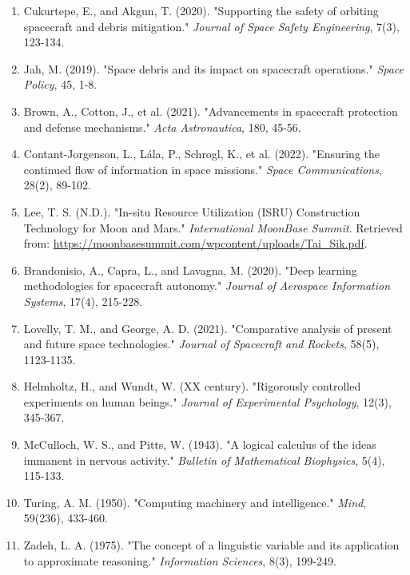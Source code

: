 \documentclass[a4paper, 11pt]{article}
\begin{document}
\begin{enumerate}
    \item Cukurtepe, E., and Akgun, T. (2020). "Supporting the safety of orbiting spacecraft and debris mitigation." \textit{Journal of Space Safety Engineering}, 7(3), 123-134.
    
    \item Jah, M. (2019). "Space debris and its impact on spacecraft operations." \textit{Space Policy}, 45, 1-8.
    
    \item Brown, A., Cotton, J., et al. (2021). "Advancements in spacecraft protection and defense mechanisms." \textit{Acta Astronautica}, 180, 45-56.
    
    \item Contant-Jorgenson, L., Lála, P., Schrogl, K., et al. (2022). "Ensuring the continued flow of information in space missions." \textit{Space Communications}, 28(2), 89-102.
    
    \item Lee, T. S. (N.D.). "In-situ Resource Utilization (ISRU) Construction Technology for Moon and Mars." \textit{International MoonBase Summit}. Retrieved from: \url{https://moonbasesummit.com/wpcontent/uploads/Tai_Sik.pdf}.
    
    \item Brandonisio, A., Capra, L., and Lavagna, M. (2020). "Deep learning methodologies for spacecraft autonomy." \textit{Journal of Aerospace Information Systems}, 17(4), 215-228.
    
    \item Lovelly, T. M., and George, A. D. (2021). "Comparative analysis of present and future space technologies." \textit{Journal of Spacecraft and Rockets}, 58(5), 1123-1135.
    
    \item Helmholtz, H., and Wundt, W. (XX century). "Rigorously controlled experiments on human beings." \textit{Journal of Experimental Psychology}, 12(3), 345-367.
    
    \item McCulloch, W. S., and Pitts, W. (1943). "A logical calculus of the ideas immanent in nervous activity." \textit{Bulletin of Mathematical Biophysics}, 5(4), 115-133.
    
    \item Turing, A. M. (1950). "Computing machinery and intelligence." \textit{Mind}, 59(236), 433-460.
    
    \item Zadeh, L. A. (1975). "The concept of a linguistic variable and its application to approximate reasoning." \textit{Information Sciences}, 8(3), 199-249.
    

\end{enumerate}
\end{document}
